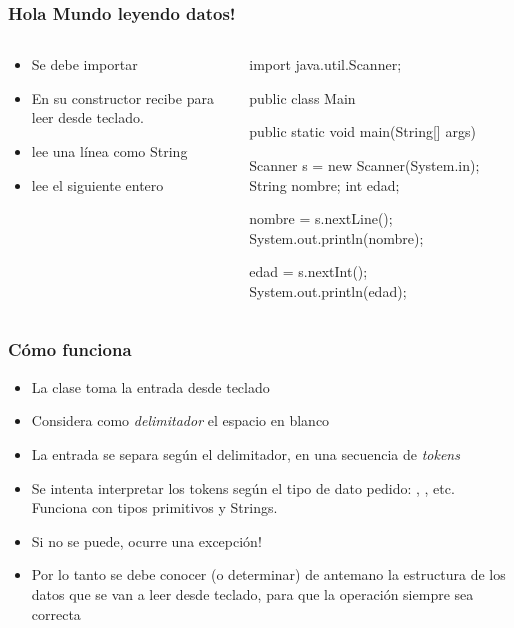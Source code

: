 \documentclass{beamer}
\begin{document}
\begin{frame}[fragile]
  \frametitle{Hola Mundo leyendo datos!}

   \begin{columns}
     \begin{column}{0.4\textwidth}
       \begin{small}
         \begin{itemize}
         \item Se debe importar          
         \item En su constructor recibe  para leer
           desde teclado.
         \item {} lee una línea como String           
         \item {} lee el siguiente entero
         \end{itemize}
       \end{small}
     \end{column}
    \begin{column}{0.6\textwidth}
      
      \begin{jsmall}
        import java.util.Scanner;
        
        public class Main {
          public static void main(String[] args) {
            Scanner s = new Scanner(System.in);
            String nombre;
            int edad;

            nombre = s.nextLine();           
            System.out.println(nombre);

            edad = s.nextInt();
            System.out.println(edad);
          }
        }
      \end{jsmall}
      
    \end{column}
  \end{columns}
  
\end{frame}

\begin{frame}
  \frametitle{Cómo funciona }

  \begin{itemize}
  \item La clase  toma la entrada desde teclado    
  \item Considera como \emph{delimitador} el espacio en blanco    
  \item La entrada se separa según el delimitador, en una secuencia de
    \emph{tokens}    
  \item Se intenta interpretar los tokens según el tipo de dato
    pedido: , , etc. Funciona con
    tipos primitivos y Strings.   
  \item Si no se puede, ocurre una excepción!    
  \item Por lo tanto se debe conocer (o determinar) de antemano la
    estructura de los datos que se van a leer desde teclado, para que
    la operación siempre sea correcta
  \end{itemize}
  
\end{frame}
\end{document}
